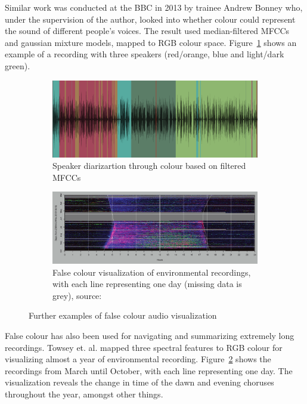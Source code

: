Similar work was conducted at the BBC in 2013 by trainee Andrew Bonney who,
under the supervision of the author, looked into whether colour could represent
the sound of different people's voices. The result used median-filtered MFCCs
and gaussian mixture models, mapped to RGB colour space.
Figure~\ref{fig:bonney} shows an example of a recording with three speakers
(red/orange, blue and light/dark green).

\begin{figure}[ht]
\centering
\begin{subfigure}{.5\textwidth}
  \centering
  \includegraphics[width=0.95\linewidth]{figs/bonney.png}
  \caption{Speaker diarizartion through colour based on filtered MFCCs}
  \label{fig:bonney}
\end{subfigure}%
\begin{subfigure}{.5\textwidth}
  \centering
  \includegraphics[width=0.95\linewidth]{figs/towsey.png}
  \caption{False colour visualization of environmental recordings, with each
    line representing one day (missing data is grey), source:
    \citep{Towsey2014}}
  \label{fig:towsey}
\end{subfigure}
  \caption{Further examples of false colour audio visualization}
\label{fig:falsecolour}
\end{figure}

False colour has also been used for navigating and summarizing extremely long
recordings. Towsey et. al. \citep{Towsey2014} mapped three spectral features to
RGB colour for visualizing almost a year of environmental recording.
Figure~\ref{fig:towsey} shows the recordings from March until October, with
each line representing one day. The visualization reveals the change in time of
the dawn and evening choruses throughout the year, amongst other things.

